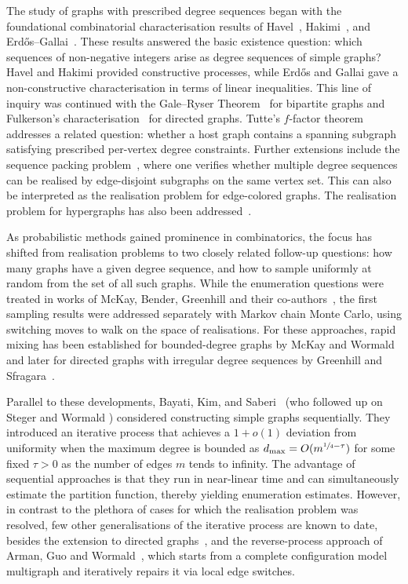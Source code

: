 \documentclass{article}
\theoremstyle{plain}
\theoremstyle{remark}
\theoremstyle{plain}
\numberwithin{equation}{section}
\begin{document}
	
	The study of graphs with prescribed degree sequences began with the foundational combinatorial characterisation results of Havel~\cite{havel1955}, Hakimi~\cite{hakimi1962}, and Erdős--Gallai~\cite{erdos1960}. These results answered the basic existence question: which sequences of non-negative integers arise as degree sequences of simple graphs?  Havel and Hakimi provided constructive processes, while Erdős and Gallai gave a non-constructive characterisation in terms of linear inequalities. This line of inquiry was continued with the Gale--Ryser Theorem~\cite{Gale1957,Ryser1957} for bipartite graphs and Fulkerson's characterisation~\cite{fulkerson1960} for directed graphs. Tutte's $f$-factor theorem~\cite{Tutte1952} addresses a related question: whether a host graph contains a spanning subgraph satisfying prescribed per-vertex degree constraints.
	Further extensions include the sequence packing problem~\cite{West2012}, where one verifies whether multiple degree sequences can be realised by edge-disjoint subgraphs on the same vertex set. This can also be interpreted as the realisation problem for edge-colored graphs. The realisation problem for hypergraphs has also been addressed~\cite{Li2025,Deza2018}.
	
	
	As probabilistic methods gained prominence in combinatorics, the focus has shifted from realisation problems to two closely related follow-up questions: how many graphs have a given degree sequence, and how to sample uniformly at random from the set of all such graphs. 
	While the enumeration questions were treated in works of McKay, Bender, Greenhill and their co-authors~\cite{mckay1985asymptotics,mckay1984asymptotics,BENDER1978296,GREENHILL2008,greenhill2024enumerationdihypergraphsspecifieddegrees,greenhill2026asymptoticenumerationconstrainedbipartite},
	the first sampling results were addressed separately  with Markov chain Monte Carlo, using switching moves to walk on the space of realisations. For these approaches, rapid mixing has been established for bounded-degree graphs by McKay and Wormald~\cite{MCKAY199052} and later for directed graphs with irregular degree sequences by Greenhill and Sfragara~\cite{Greenhill2018}.
	
	Parallel to these developments, Bayati, Kim, and Saberi~\cite{Bayati} (who followed up on Steger and Wormald \cite{Steger1999}) considered constructing simple graphs sequentially. They introduced an iterative process that achieves a $1+o(1)$ deviation from uniformity when the maximum degree is bounded as $d_{\max} = O(m^{\sfrac14-\tau})$ for some fixed $\tau > 0$ as the number of edges $m$ tends to infinity. The advantage of sequential approaches is that they run in near-linear time and can simultaneously estimate the partition function, thereby yielding enumeration estimates. However, in contrast to the plethora of cases for which the realisation problem was resolved, few other generalisations of the iterative process are known to date, besides the extension to directed graphs~\cite{Ieperen2024}, and the reverse-process approach of Arman, Guo and Wormald~\cite{Arman2021}, which starts from a complete configuration model multigraph and iteratively repairs it via local edge switches.
	
\end{document}
